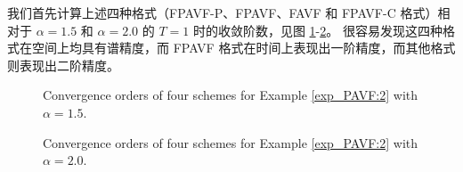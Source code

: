 	我们首先计算上述四种格式（FPAVF-P、FPAVF、FAVF 和 FPAVF-C 格式）相对于 $\alpha=1.5$ 和 $\alpha=2.0$ 的 $T=1$ 时的收敛阶数，见图 \ref{fig_PAVF:1}-\ref{fig_PAVF:2}。
	很容易发现这四种格式在空间上均具有谱精度，而 FPAVF 格式在时间上表现出一阶精度，而其他格式则表现出二阶精度。
	

	\begin{figure}[H]
		\begin{center}
		\caption{Convergence orders of four schemes for Example \ref{exp_PAVF:2} with $\alpha=1.5$.} \label{fig_PAVF:1}
		\end{center}
		\end{figure}
		
		\begin{figure}[H]
		\begin{center}
		\caption{Convergence orders of four schemes for Example \ref{exp_PAVF:2} with $\alpha=2.0$.} \label{fig_PAVF:2}
		\end{center}
		\end{figure}


